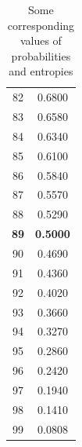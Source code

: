 \documentclass[a4paper,12pt,%
onecolumn,oneside,article,%
british%
]{memoir}
\newcommand*{\amp}{\&}
\newenvironment{acknowledgements}{\section*{Thanks}\addcontentsline{toc}{section}{Thanks}}{\par}
\renewcommand*{\|}[1][]{\nonscript\:#1\vert\nonscript\:\mathopen{}}
\begin{document}
\begin{table}
\begin{minipage}{0.49\linewidth}
\begin{tabular}{cc}
      82 & 0.6800 \\
      83 & 0.6580 \\
      84 & 0.6340 \\
      85 & 0.6100 \\
      86 & 0.5840 \\
      87 & 0.5570 \\
      88 & 0.5290 \\
      \bfseries 89 &\bfseries  0.5000 \\
      90 & 0.4690 \\
      91 & 0.4360 \\
      92 & 0.4020 \\
      93 & 0.3660 \\
      94 & 0.3270 \\
      95 & 0.2860 \\
      96 & 0.2420 \\
      97 & 0.1940 \\
      98 & 0.1410 \\
      99 & 0.0808
    \end{tabular}
  \end{minipage}  \caption{Some corresponding values of probabilities and entropies}
  \label{tab:entr_prob}
\end{table}

\bigskip
\end{document}
